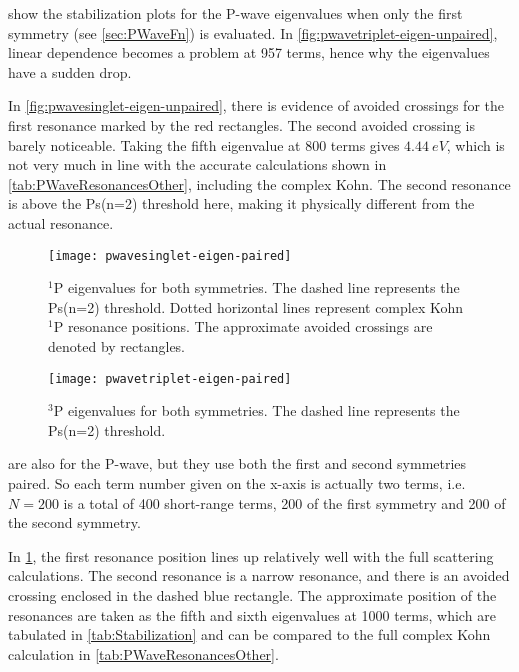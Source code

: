 \documentclass[Dissertation.tex]{subfiles}
\begin{document}
 show 
the stabilization plots for the P-wave eigenvalues when only the first 
symmetry (see \cref{sec:PWaveFn}) is evaluated. %
In \cref{fig:pwavetriplet-eigen-unpaired}, linear dependence becomes a 
problem at 957 terms, hence why the eigenvalues have a sudden drop.

In \cref{fig:pwavesinglet-eigen-unpaired}, there is evidence of avoided 
crossings for the first resonance marked by the red rectangles. The second 
avoided crossing is barely noticeable. Taking the fifth eigenvalue at 800 
terms gives $\SI{4.44}{eV}$, which is not very much in line with the accurate 
calculations shown in \cref{tab:PWaveResonancesOther}, including the complex 
Kohn. The second resonance is above the Ps(n=2) threshold here, making it 
physically different from the actual resonance.

\begin{figure}
	\centering
	\texttt{[image: pwavesinglet-eigen-paired]}
	\caption[$^1$P eigenvalues for both symmetries]{$^1$P eigenvalues for both symmetries. The dashed line represents the Ps(n=2) threshold. Dotted horizontal lines represent complex Kohn $^1$P resonance positions. The approximate avoided crossings are denoted by rectangles.}
	\label{fig:pwavesinglet-eigen-paired}
\end{figure}

\begin{figure}
	\centering
	\texttt{[image: pwavetriplet-eigen-paired]}
	\caption[$^3$P eigenvalues for both symmetries]{$^3$P eigenvalues for both symmetries. The dashed line represents the Ps(n=2) threshold.}
	\label{fig:pwavetriplet-eigen-paired}
\end{figure}

 are also 
for the P-wave, but they use both the first and second symmetries paired. So 
each term number given on the x-axis is actually two terms, i.e. $N = 200$ is 
a total of 400 short-range terms, 200 of the first symmetry and 200 of the 
second symmetry. %

In \cref{fig:pwavesinglet-eigen-paired}, the first resonance position lines 
up relatively well with the full scattering calculations. The second 
resonance is a narrow resonance, and there is an avoided crossing enclosed in 
the dashed blue rectangle. The approximate position of the resonances are 
taken as the fifth and sixth eigenvalues at 1000 terms, which are tabulated 
in \cref{tab:Stabilization} and can be compared to the full complex Kohn 
calculation in \cref{tab:PWaveResonancesOther}.
\end{document}
